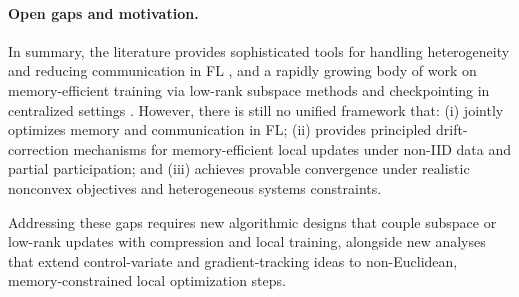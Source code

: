 \paragraph{Open gaps and motivation.}
In summary, the literature provides sophisticated tools for handling heterogeneity and reducing communication in FL \cite{mcmahan2017communication,karimireddy2020scaffold,stich2019localSGD,alistarh2017qsgd,he2022lowerbounds}, and a rapidly growing body of work on memory-efficient training via low-rank subspace methods and checkpointing in centralized settings \cite{chen2016sublinear,hu2021lora,zhao2024galore,he2024subspaceLLM}. However, there is still no unified framework that:
(i) jointly optimizes memory and communication in FL;
(ii) provides principled drift-correction mechanisms for memory-efficient local updates under non-IID data and partial participation; and
(iii) achieves provable convergence under realistic nonconvex objectives and heterogeneous systems constraints.

Addressing these gaps requires new algorithmic designs that couple subspace or low-rank updates with compression and local training, alongside new analyses that extend control-variate and gradient-tracking ideas to non-Euclidean, memory-constrained local optimization steps.
